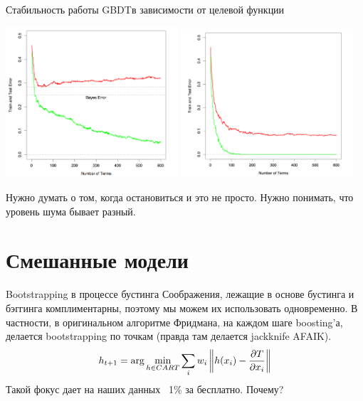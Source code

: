 \documentclass[14pt, fleqn, xcolor={dvipsnames, table}]{beamer}
\begin{document}
\begin{frame}{Стабильность работы GBDT}{в зависимости от целевой функции}
\begin{center}
\includegraphics[width=0.48\textwidth]{noise.png}
\includegraphics[width=0.48\textwidth]{train_error.png}
\end{center}
Нужно думать о том, когда остановиться и это не просто. Нужно понимать, что уровень шума бывает разный.
\end{frame}



\section{Смешанные модели}

\begin{frame}{Bootstrapping в процессе бустинга}
Соображения, лежащие в основе бустинга и бэггинга комплиментарны, поэтому мы можем их использовать одновременно. В частности, в оригинальном алгоритме Фридмана, на каждом шаге boosting'а, делается bootstrapping по точкам (правда там делается jackknife AFAIK).
$$
h_{t+1} = \arg \min_{h \in CART} \sum_i w_i \left\|h(x_i) - {\partial T \over \partial x_i}\right\|
$$
Такой фокус дает на наших данных ~1\% за бесплатно. Почему?
\end{frame}
\end{document}
